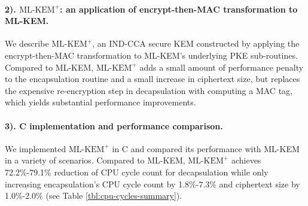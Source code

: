 \documentclass[journal=tches,submission]{iacrtrans}
\def\mlkemplus{\text{ML-KEM}^+}
\begin{document}
\paragraph{2). $\mlkemplus$: an application of encrypt-then-MAC transformation to ML-KEM.} We describe $\mlkemplus$, an IND-CCA secure KEM constructed by applying the encrypt-then-MAC transformation to ML-KEM's underlying PKE sub-routines. Compared to ML-KEM, $\mlkemplus$ adds a small amount of performance penalty to the encapsulation routine and a small increase in ciphertext size, but replaces the expensive re-encryption step in decapsulation with computing a MAC tag, which yields substantial performance improvements.

\paragraph{3). C implementation and performance comparison.} We implemented $\mlkemplus$ in C and compared its performance with ML-KEM in a variety of scenarios. Compared to ML-KEM, $\mlkemplus$ achieves 72.2\%-79.1\% reduction of CPU cycle count for decapsulation while only increasing encapsulation's CPU cycle count by 1.8\%-7.3\% and ciphertext size by 1.0\%-2.0\% (see Table \ref{tbl:cpu-cycles-summary}).
\end{document}
